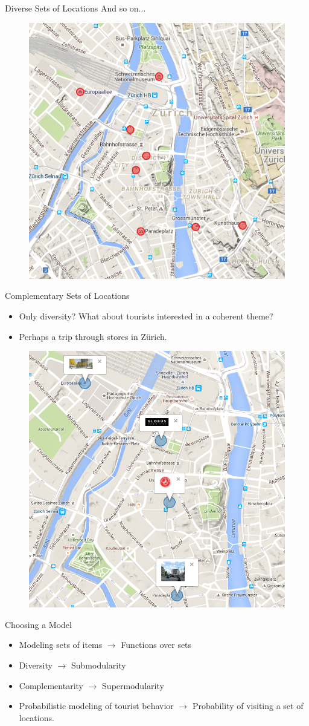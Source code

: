 \documentclass{beamer}
\begin{document}
\begin{frame}{Diverse Sets of Locations}
  And so on...
  \begin{figure}
    \centering
    \includegraphics[width=.55\textwidth]{diversity_set_3}
  \end{figure}
\end{frame}

\begin{frame}{Complementary Sets of Locations}
  \begin{itemize}
    \item Only diversity? What about tourists interested in a coherent theme?
    \item Perhaps a trip through stores in Zürich.
  \end{itemize}
  \begin{figure}
    \centering
    \includegraphics[width=.5\textwidth]{coherent_set}
  \end{figure}
\end{frame}

\begin{frame}{Choosing a Model}
  \begin{itemize}
    \item Modeling sets of items $\rightarrow$ Functions over sets
    \item Diversity $\rightarrow$ Submodularity
    \item Complementarity $\rightarrow$ Supermodularity
    \item Probabilistic modeling of tourist behavior $\rightarrow$ Probability of visiting a set of locations.
  \end{itemize}
\end{frame}
\end{document}

